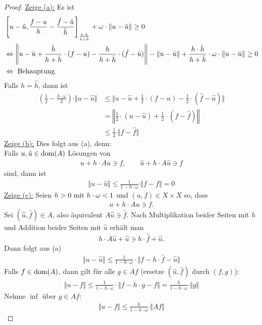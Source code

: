 \begin{proof}
	\underline{Zeige (a):} Es ist
	\begin{align*}
		&\left[u-\hat{u},\frac{f-u}{h}-\frac{\hat{f}-\hat{u}}{\hat{h}}\right]_{\frac{h\cdot\hat{h}}{h+\hat{h}}}+\omega\cdot\Vert u-\hat{u}\Vert\geq0\\
		&\gdw
		\left\Vert u-\hat{u}+\frac{\hat{h}}{h+\hat{h}}\cdot(f-u)-\frac{h}{h+\hat{h}}\cdot(\hat{f}-\hat{u})\right\Vert
		-\Vert u-\hat{u}\Vert+\frac{h\cdot\hat{h}}{h+\hat{h}}\cdot\omega\cdot\Vert u-\hat{u}\Vert\geq0\\
		&\gdw\text{ Behauptung}
	\end{align*}
	Falls $h=\hat{h}$, dann ist
	\begin{align*}
		\left(\frac{1}{2}-\frac{h\cdot\omega}{2}\right)\cdot\Vert u-\hat{u}\Vert
		&\leq
		\Big\Vert u-\hat{u}+\frac{1}{2}\cdot(f-u)-\frac{1}{2}\cdot(\hat{f}-\hat{u})\Big\Vert\\
		&=\left\Vert\frac{1}{2}\cdot(u-\hat{u})+\frac{1}{2}\cdot(f-\hat{f})\right\Vert\\
		&\leq
		\frac{1}{2}\cdot\Vert f-\hat{f}\Vert
	\end{align*}
	\underline{Zeige (b):} Dies folgt aus (a), denn:\\
	Falls $u,\hat{u}\in\dom(A)$ Lösungen von
	\begin{align*}
		u+h\cdot Au\ni f,\qquad\hat{u}+h\cdot A\hat{u}\ni f
	\end{align*}
	sind, dann ist
	\begin{align*}
		\Vert u-\hat{u}\Vert\leq\frac{1}{1-h\cdot\omega}\cdot\Vert f-f\Vert=0
	\end{align*}
	\underline{Zeige (c):} Seien $h>0\mit h\cdot\omega<1$ und $(u,f)\in X\times X$ so, dass
	\begin{align*}
		u+h\cdot Au\ni f.
	\end{align*}
	Sei $(\hat{u},\hat{f})\in A$, also äquivalent $A\hat{u}\ni\hat{f}$. 
	Nach Multiplikation beider Seiten mit $h$ und Addition beider Seiten mit $\hat{u}$ erhält man
	\begin{align*}
		h\cdot A\hat{u}+\hat{u}\ni h\cdot\hat{f}+\hat{u}.
	\end{align*}
	Dann folgt aus (a)
	\begin{align*}
		\Vert u-\hat{u}\Vert\leq\frac{1}{1-h\cdot\omega}\cdot\big\Vert f-h\cdot\hat{f}-\hat{u}\big\Vert
	\end{align*}
	Falls $f\in\dom(A)$, dann gilt für alle $g\in Af$ (ersetze $(\hat{u},\hat{f})$ durch $(f,g)$):
	\begin{align*}
		\Vert u- f\Vert
		\leq
		\frac{1}{1-h\cdot\omega}\cdot\big\Vert f-h\cdot g-f\big\Vert
		=\frac{h}{1-h\cdot\omega}\cdot\Vert g\Vert
	\end{align*}
	Nehme $\inf$ über $g\in Af$:
	\begin{align*}
		\Vert u-f\Vert\leq\frac{h}{1-h\cdot\omega}\cdot\Vert Af\Vert
	\end{align*}
\end{proof}

